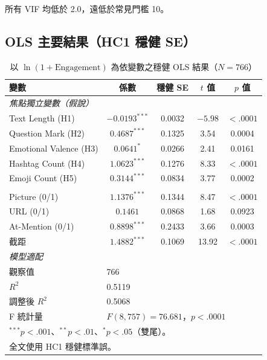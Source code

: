\documentclass[12pt,a4paper]{ctexart}
\begin{document}
所有 VIF 均低於 2.0，遠低於常見門檻 10。

\subsection{OLS 主要結果（HC1 穩健 SE）}

\begin{table}[H]
\centering
\caption{以 $\ln(1+\text{Engagement})$ 為依變數之穩健 OLS 結果（$N=766$）}
\label{tab:regression_main}
\small
\begin{tabular}{lcccc}
\toprule
變數 & 係數 & 穩健 SE & $t$ 值 & $p$ 值 \\
\midrule
\multicolumn{5}{l}{\textit{焦點獨立變數（假說）}} \\
Text Length (H1) & $-0.0193^{***}$ & 0.0032 & $-5.98$ & $<.0001$ \\
Question Mark (H2) & $0.4687^{***}$ & 0.1325 & 3.54 & 0.0004 \\
Emotional Valence (H3) & $0.0641^{*}$ & 0.0266 & 2.41 & 0.0161 \\
Hashtag Count (H4) & $1.0623^{***}$ & 0.1276 & 8.33 & $<.0001$ \\
Emoji Count (H5) & $0.3144^{***}$ & 0.0834 & 3.77 & 0.0002 \\
\addlinespace
\multicolumn{5}{l}{\textit{控制變數（0/1 虛擬編碼）}} \\
Picture (0/1) & $1.1376^{***}$ & 0.1344 & 8.47 & $<.0001$ \\
URL (0/1) & $0.1461$ & 0.0868 & 1.68 & 0.0923 \\
At-Mention (0/1) & $0.8898^{***}$ & 0.2433 & 3.66 & 0.0003 \\
\addlinespace
截距 & $1.4882^{***}$ & 0.1069 & 13.92 & $<.0001$ \\
\midrule
\multicolumn{5}{l}{\textit{模型適配}} \\
觀察值 & \multicolumn{4}{l}{766} \\
$R^2$ & \multicolumn{4}{l}{0.5119} \\
調整後 $R^2$ & \multicolumn{4}{l}{0.5068} \\
F 統計量 & \multicolumn{4}{l}{$F(8, 757) = 76.681$，$p<.0001$} \\
\bottomrule
\multicolumn{5}{l}{\small $^{***}p<.001$、$^{**}p<.01$、$^{*}p<.05$（雙尾）。} \\
\multicolumn{5}{l}{\small 全文使用 HC1 穩健標準誤。} \\
\end{tabular}
\end{table}
\end{document}
